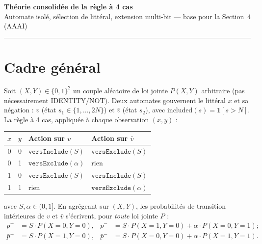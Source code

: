 \documentclass[12pt,a4paper]{article}
\theoremstyle{remark}
\newcommand{\vbar}{\bar{v}}
\begin{document}
\begin{center}
  {\LARGE\bfseries Théorie consolidée de la règle à 4 cas}\\[6pt]
  {\large Automate isolé, sélection de littéral, extension multi-bit --- base pour la Section~4 (AAAI)}
\end{center}
\vspace{0.5em}\hrule\vspace{1.5em}

\tableofcontents
\newpage

\section{Cadre général}

Soit $(X,Y)\in\{0,1\}^2$ un couple aléatoire de loi jointe $P(X,Y)$ arbitraire (pas
nécessairement IDENTITY/NOT). Deux automates gouvernent le littéral $x$ et sa
négation : $v$ (état $s_1\in\{1,\ldots,2N\}$) et $\vbar$ (état $s_2$), avec
$\mathrm{included}(s)=\mathbf 1[s>N]$. La règle à 4 cas, appliquée à chaque
observation $(x,y)$ :

\begin{center}
\begin{tabular}{ccll}
\toprule
$x$ & $y$ & Action sur $v$ & Action sur $\vbar$ \\
\midrule
0 & 0 & $\texttt{versInclude}(S)$ & $\texttt{versExclude}(S)$ \\
0 & 1 & $\texttt{versExclude}(\alpha)$ & rien \\
1 & 0 & $\texttt{versExclude}(S)$ & $\texttt{versInclude}(S)$ \\
1 & 1 & rien & $\texttt{versExclude}(\alpha)$ \\
\bottomrule
\end{tabular}
\end{center}

avec $S,\alpha\in(0,1]$. En agrégeant sur $(X,Y)$, les probabilités de transition
intérieures de $v$ et $\vbar$ s'écrivent, pour \emph{toute} loi jointe $P$ :
\begin{align}
  p^+ &= S\cdot P(X{=}0,Y{=}0), &
  p^- &= S\cdot P(X{=}1,Y{=}0) + \alpha\cdot P(X{=}0,Y{=}1); \label{eq:pv}\\
  \bar p^+ &= S\cdot P(X{=}1,Y{=}0), &
  \bar p^- &= S\cdot P(X{=}0,Y{=}0) + \alpha\cdot P(X{=}1,Y{=}1). \label{eq:pvbar}
\end{align}
\end{document}
